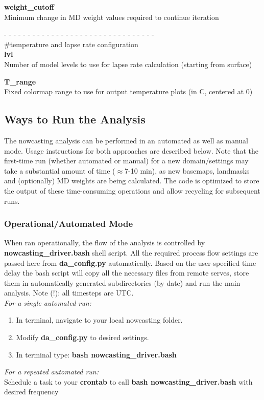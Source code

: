 \documentclass{article}
\begin{document}
\vspace{0.1cm}
\noindent \textbf{weight\_cutoff}\\
Minimum change in MD weight values required to continue iteration


\vspace{0.5cm}
\noindent- - - - - - - - - - - - - - - - - - - - - - - - - - - - - - - -\\
\noindent\#temperature and lapse rate configuration\\

\noindent \textbf{lvl}\\
Number of model levels to use for lapse rate calculation (starting from surface)

\vspace{0.1cm}
\noindent \textbf{T\_range}\\
Fixed colormap range to use for output temperature plots (in C, centered at 0)


\subsection{Ways to Run the Analysis}\label{sec:run}
The nowcasting analysis can be performed in an automated as well as manual mode. Usage instructions for both approaches are described below. Note that the first-time run (whether automated or manual) for a new domain/settings may take a substantial amount of time ($\approx$7-10 min), as new basemaps, landmasks and (optionally) MD weights are being calculated. The code is optimized to store the output of these time-consuming operations and allow recycling for subsequent runs. 

\subsubsection{Operational/Automated Mode}
When ran operationally, the flow of the analysis is controlled by \textbf{nowcasting\_driver.bash} shell script. All the required process flow settings are passed here from \textbf{da\_config.py} automatically. Based on the user-specified time delay the bash script will copy all the necessary files from remote serves, store them in automatically generated subdirectories (by date) and run the main analysis. Note (!): all timesteps are UTC. \\

\noindent \emph{For a single automated run:} 
\begin{enumerate}[1.]
\item In terminal, navigate to your local nowcasting folder. 
\item Modify \textbf{da\_config.py} to desired settings.
\item In terminal type: \textbf{bash nowcasting\_driver.bash}\\
\end{enumerate}
\noindent \emph{For a repeated automated run:} \\
\noindent Schedule a task to your \textbf{crontab} to call  \textbf{bash nowcasting\_driver.bash} with desired frequency\\
\end{document}

